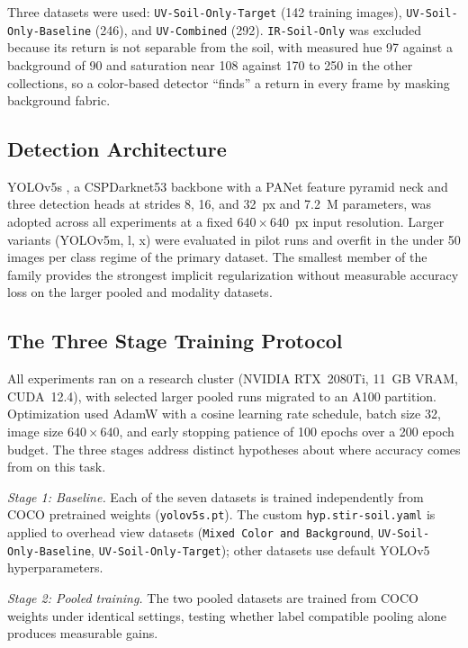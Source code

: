 ﻿\documentclass[journal]{IEEEtran}
\begin{document}
Three datasets were used: \texttt{UV-Soil-Only-Target} (142 training images), \texttt{UV-Soil-Only-Baseline} (246), and \texttt{UV-Combined} (292). \texttt{IR-Soil-Only} was excluded because its return is not separable from the soil, with measured hue 97 against a background of 90 and saturation near 108 against 170 to 250 in the other collections, so a color-based detector ``finds'' a return in every frame by masking background fabric.

\subsection{Detection Architecture}
YOLOv5s \cite{jocher2020yolov5}, a CSPDarknet53 backbone with a PANet feature pyramid neck and three detection heads at strides 8, 16, and 32~px and 7.2~M parameters, was adopted across all experiments at a fixed $640 \times 640$~px input resolution. Larger variants (YOLOv5m, l, x) were evaluated in pilot runs and overfit in the under 50 images per class regime of the primary dataset. The smallest member of the family provides the strongest implicit regularization without measurable accuracy loss on the larger pooled and modality datasets.

\subsection{The Three Stage Training Protocol}
All experiments ran on a research cluster (NVIDIA RTX~2080Ti, 11~GB VRAM, CUDA~12.4), with selected larger pooled runs migrated to an A100 partition. Optimization used AdamW with a cosine learning rate schedule, batch size 32, image size $640 \times 640$, and early stopping patience of 100 epochs over a 200 epoch budget. The three stages address distinct hypotheses about where accuracy comes from on this task.

\emph{Stage 1: Baseline.} Each of the seven datasets is trained independently from COCO pretrained weights (\texttt{yolov5s.pt}). The custom \texttt{hyp.stir-soil.yaml} is applied to overhead view datasets (\texttt{Mixed Color and Background}, \texttt{UV-Soil-Only-Baseline}, \texttt{UV-Soil-Only-Target}); other datasets use default YOLOv5 hyperparameters.

\emph{Stage 2: Pooled training.} The two pooled datasets are trained from COCO weights under identical settings, testing whether label compatible pooling alone produces measurable gains.
\end{document}
